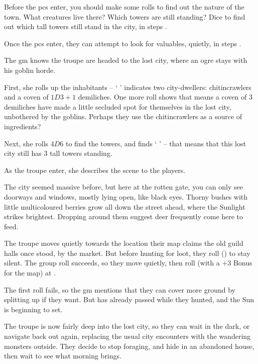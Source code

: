 \begin{multicols}{2}
Before the \glspl{pc} enter, you should make some rolls to find out the nature of the town.
What creatures live there?
Which towers are still standing?
Dice to find out which tall towers still stand in the city, in steps .

Once the \glspl{pc} enter, they can attempt to look for valuables, quietly, in steps .

\begin{exampletext}
  The \gls{gm} knows the troupe are headed to the lost city, where an ogre stays with his goblin horde.

  First, she rolls up the inhabitants -- `  ' indicates two city-dwellers: chitincrawlers and a coven of $1D3+1$ demiliches.
  One more roll shows that means a coven of 3 demiliches have made a little secluded spot for themselves in the lost city, unbothered by the goblins.
  Perhaps they use the chitincrawlers as a source of \glspl{ingredient}?

  Next, she rolls $4D6$ to find the towers, and finds `   ' -- that means that this lost city still has 3 tall towers standing.

  As the troupe enter, she describes the scene to the players.

  \begin{boxtext}
    The city seemed massive before, but here at the rotten gate, you can only see doorways and windows, mostly lying open, like black eyes.
    Thorny bushes with little multicoloured berries grow all down the street ahead, where the Sunlight strikes brightest.
    Dropping around them suggest deer frequently come here to feed.
  \end{boxtext}

  The troupe moves quietly towards the location their map claims the old guild halls once stood, by the market.
  But before hunting for loot, they roll  (\tn[8]) to stay silent.
  The group roll succeeds, so they move quietly, then roll  (with a +3 Bonus for the map) at \tn[12].

  The first roll fails, so the \gls{gm} mentions that they can cover more ground by splitting up if they want.
  But  has already passed while they hunted, and the Sun is beginning to set.

  The troupe is now fairly deep into the lost city, so they can wait in the dark, or navigate back out again, replacing the usual city encounters with the wandering monsters outside.
  They decide to stop foraging, and hide in an abandoned house, then wait to see what morning brings.


\end{exampletext}
\end{multicols}
